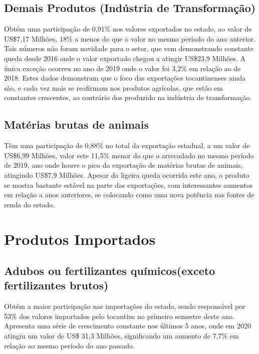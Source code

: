 \subsection {Demais Produtos (Indústria de Transformação)}
\par Obtém uma participação de 0,91\% nos valores exportados no estado, ao valor de US\$7,17 Milhões, 18\% a menos do que o valor no mesmo período do ano anterior. Tais números não foram novidade para o setor, que vem demonstrando constante queda desde 2016 onde o valor exportado chegou a atingir US\$23,9 Milhões. A única exceção ocorreu no ano de 2019 onde o valor foi 3,2\% em relação ao de 2018. Estes dados demonstram que o foco das exportações tocantinenses ainda são, e cada vez mais se reafirmam nos produtos agrícolas, que estão em constantes crescentes, ao contrário dos produzido na indústria de transformação. 

\subsection{Matérias brutas de animais}
\par Têm uma participação de 0,88\% no total da exportação estadual, a um valor de US\$6,99 Milhões, valor este 11,5\% menor do que o arrecadado no mesmo período de 2019, ano onde houve o pico da exportação de matérias brutas de animais, atingindo US\$7,9 Milhões. Apesar da ligeira queda ocorrida este ano, o produto se mostra bastante estável na parte das exportações, com interessantes aumentos em relação a anos anteriores, se colocando como uma nova potência nas fontes de renda do estado.

\section{Produtos Importados}

\subsection{Adubos ou fertilizantes químicos(exceto fertilizantes brutos)}
\par Obtém a maior participação nas importações do estado, sendo responsável por 53\% dos valores importados pelo tocantins no primeiro semestre deste ano. Apresenta uma série de crescimento constante nos últimos 5 anos, onde em 2020 atingiu um valor de US\$ 31,3 Milhões, significando um aumento de 7,7\% em relação ao mesmo período do ano passado.

